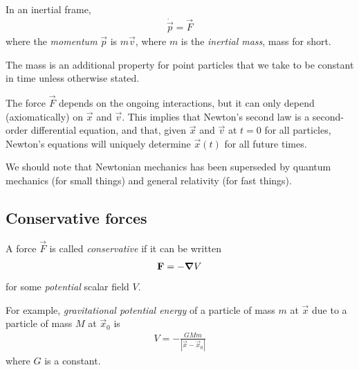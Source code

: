 \documentclass{../template/note}
\begin{document}
    \begin{theorem}
        In an inertial frame,
        \begin{align*}
            \dot{\vec p} = \vec F
        \end{align*}
        where the \emph{momentum} \(\vec p\) is \(m \vec v\), where \(m\) is the \emph{inertial mass}, mass for short.
    \end{theorem}
    
    The mass is an additional property for point particles that we take to be constant in time unless otherwise stated.

    The force \(\vec F\) depends on the ongoing interactions, but it can only depend (axiomatically) on \(\vec x\) and \(\vec v\). This implies that Newton's second law is a second-order differential equation, and that, given \(\vec x\) and \(\vec v\) at \(t=0\) for all particles, Newton's equations will uniquely determine \(\vec x(t)\) for all future times.

    We should note that Newtonian mechanics has been superseded by quantum mechanics (for small things) and general relativity (for fast things).
    
    \subsection{Conservative forces}

    \begin{definition}
        A force \(\vec F\) is called \emph{conservative} if it can be written
        \begin{align*}
            \vec F = -\grad V
        \end{align*}
        for some \emph{potential} scalar field \(V\).
    \end{definition}
    
    For example, \emph{gravitational potential energy} of a particle of mass \(m\) at \(\vec x\) due to a particle of mass \(M\) at \(\vec x_0\) is
    \begin{align*}
        V = -\frac{GMm}{|\vec x - \vec x_0|}
    \end{align*}
    where \(G\) is a constant.
\end{document}
